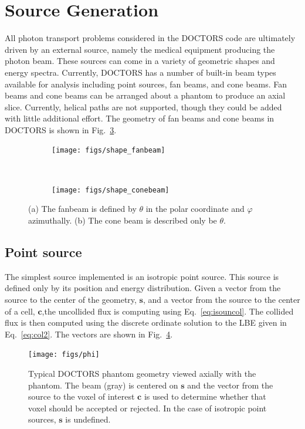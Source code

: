 \section{Source Generation}\label{sec:source_gen}
All photon transport problems considered in the DOCTORS code are ultimately driven by an external source, namely the medical equipment producing the photon beam. These sources can come in a variety of geometric shapes and energy spectra. Currently, DOCTORS has a number of built-in beam types available for analysis including point sources, fan beams, and cone beams. Fan beams and cone beams can be arranged about a phantom to produce an axial slice. Currently, helical paths are not supported, though they could be added with little additional effort. The geometry of fan beams and cone beams in DOCTORS is shown in Fig.~\ref{fig:shape}.

\begin{figure}
    \centering
    \begin{subfigure}[b]{.45 \textwidth}
        \texttt{[image: figs/shape\_fanbeam]}
        \caption{}
        \label{fig:shape_fanbeam}
    \end{subfigure}
    ~
    \begin{subfigure}[b]{.45 \textwidth}
        \texttt{[image: figs/shape\_conebeam]}
        \caption{}
        \label{fig:shape_conebeam}
    \end{subfigure}
    \caption{(a) The fanbeam is defined by $\theta$ in the polar coordinate and $\varphi$ azimuthally. (b) The cone beam is described only be $\theta$.}\label{fig:shape}
\end{figure}

\subsection{Point source}
The simplest source implemented is an isotropic point source. This source is defined only by its position and energy distribution. Given a vector from the source to the center of the geometry, $\boldsymbol{s}$, and a vector from the source to the center of a cell, $\boldsymbol{c}$,the uncollided flux is computing using Eq.~\ref{eq:isouncol}. The collided flux is then computed using the discrete ordinate solution to the LBE given in Eq.~\ref{eq:col2}. The vectors are shown in Fig.~\ref{fig:phi}.

\begin{figure}[tb]
  \begin{center}
   \texttt{[image: figs/phi]}
  \end{center}
  \caption{Typical DOCTORS phantom geometry viewed axially with the phantom. The beam (gray) is centered on $\boldsymbol{s}$ and the vector from the source to the voxel of interest $\boldsymbol{c}$ is used to determine whether that voxel should be accepted or rejected. In the case of isotropic point sources, $\boldsymbol{s}$ is undefined.}
\label{fig:phi}
\end{figure}

